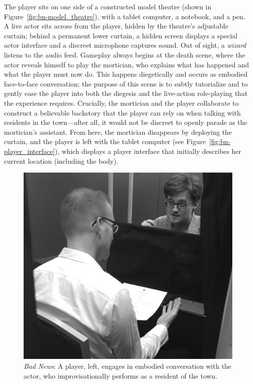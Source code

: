 \documentclass[letterpaper]{article}
\begin{document}
The player sits on one side of a constructed model theatre (shown in Figure~\ref{fig:bn-model_theatre}), with a tablet computer, a notebook, and a pen.
A live actor sits across from the player, hidden by the theatre's adjustable curtain; behind a permanent lower curtain, a hidden screen displays a special actor interface and a discreet microphone captures sound.
Out of sight, a \textit{wizard} listens to the audio feed.
Gameplay always begins at the death scene, where the actor reveals himself to play the mortician, who explains what has happened and what the player must now do.
This happens diegetically and occurs as embodied face-to-face conversation; the purpose of this scene is to subtly tutorialize and to gently ease the player into both the diegesis and the live-action role-playing that the experience requires.
Crucially, the mortician and the player collaborate to construct a believable backstory that the player can rely on when talking with residents in the town---after all, it would not be discreet to openly parade as the mortician's assistant.
From here, the mortician disappears by deploying the curtain, and the player is left with the tablet computer (see Figure~\ref{fig:bn-player_interface}), which displays a player interface that initially describes her current location (including the body).

\begin{figure}[t]
  \centering
  \includegraphics[width=0.8\columnwidth]{images/bad_news-player_and_actor}
  \caption{\textit{Bad News}: A player, left, engages in embodied conversation with the actor, who improvisationally performs as a resident of the town.}
  \label{fig:bn-player_and_actor}
\end{figure}
\end{document}
